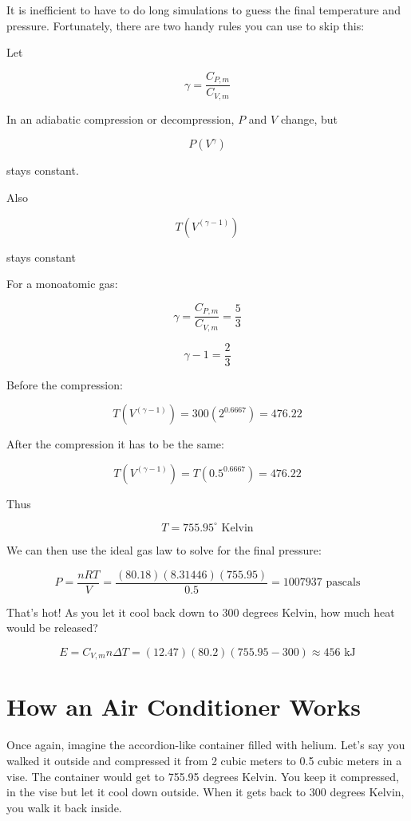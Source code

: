 It is inefficient to have to do long simulations to guess the final temperature and pressure. Fortunately,  there are two handy rules you can use to skip this:

\begin{mdframed}[style=important, frametitle={Adiabatic Compression and Decompression}]

Let 

$$\gamma = \frac{C_{P,m}}{C_{V,m}}$$

In an adiabatic compression or decompression,  $P$ and $V$ change,  but

$$P \left(V^\gamma \right)$$

stays constant.

Also 

$$T \left(V^{\left( \gamma - 1 \right)} \right)$$

stays constant

\end{mdframed}

For a monoatomic gas:

$$\gamma = \frac{C_{P,m}}{C_{V,m}} = \frac{5}{3}$$

$$\gamma - 1 =  \frac{2}{3}$$

Before the compression: 

$$T \left(V^{\left( \gamma - 1 \right)} \right) = 300 \left( 2^{0.6667} \right) = 476.22$$

After the compression it has to be the same:

$$T \left(V^{\left( \gamma - 1 \right)} \right) = T \left( 0.5^{0.6667} \right) = 476.22$$

Thus 

$$T = 755.95^\circ \text{ Kelvin}$$

We can then use the ideal gas law to solve for the final pressure:

$$P = \frac{n R T}{V}  =  \frac{(80.18)(8.31446)(755.95)}{0.5} = 1007937 \text{ pascals}$$

That's hot!  As you let it cool back down to 300 degrees Kelvin,  how much heat would be released?  

$$E = C_{V,m} n \Delta T = (12.47)(80.2)(755.95 - 300) \approx  456 \text{ kJ}$$

\section{How an Air Conditioner Works}

Once again, imagine the accordion-like container filled with helium.  Let's say you walked it outside and compressed it from 2 cubic meters to 0.5 cubic meters in a vise.  The container would get to 755.95 degrees Kelvin.  You keep it compressed, in the vise  but let it cool down outside.  When it gets back to 300 degrees Kelvin,  you walk it back inside.

